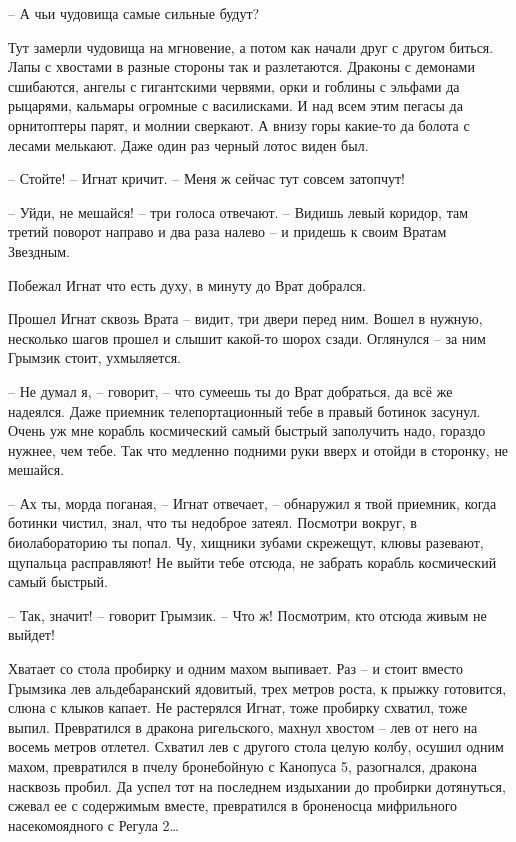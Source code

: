 \documentclass[ebook,oneside,final,openright]{memoir}
\begin{document}
– А чьи чудовища самые сильные будут?\par
Тут замерли чудовища на мгновение, а потом как начали друг с другом биться. Лапы с хвостами в разные стороны так и разлетаются. Драконы с демонами сшибаются, ангелы с гигантскими червями, орки и гоблины с эльфами да рыцарями, кальмары огромные с василисками. И над всем этим пегасы да орнитоптеры парят, и молнии сверкают. А внизу горы какие-то да болота с лесами мелькают. Даже один раз черный лотос виден был. \par
– Стойте! – Игнат кричит. – Меня ж сейчас тут совсем затопчут!\par
– Уйди, не мешайся! – три голоса отвечают. – Видишь левый коридор, там третий поворот направо и два раза налево – и придешь к своим Вратам Звездным.\par
\par
Побежал Игнат что есть духу, в минуту до Врат добрался.\par
\par
Прошел Игнат сквозь Врата – видит, три двери перед ним. Вошел в нужную, несколько шагов прошел и слышит какой-то шорох сзади. Оглянулся – за ним Грымзик стоит, ухмыляется. \par
\par
– Не думал я, – говорит, – что сумеешь ты до Врат добраться, да всё же надеялся. Даже приемник телепортационный тебе в правый ботинок засунул. Очень уж мне корабль космический самый быстрый заполучить надо, гораздо нужнее, чем тебе. Так что медленно подними руки вверх и отойди в сторонку, не мешайся.\par
– Ах ты, морда поганая, – Игнат отвечает, – обнаружил я твой приемник, когда ботинки чистил, знал, что ты недоброе затеял. Посмотри вокруг, в биолабораторию ты попал. Чу, хищники зубами скрежещут, клювы разевают, щупальца расправляют! Не выйти тебе отсюда, не забрать корабль космический самый быстрый.\par
– Так, значит! – говорит Грымзик. – Что ж! Посмотрим, кто отсюда живым не выйдет!\par
\par
Хватает со стола пробирку и одним махом выпивает. Раз – и стоит вместо Грымзика лев альдебаранский ядовитый, трех метров роста, к прыжку готовится, слюна с клыков капает. Не растерялся Игнат, тоже пробирку схватил, тоже выпил. Превратился в дракона ригельского, махнул хвостом – лев от него на восемь метров отлетел. Схватил лев с другого стола целую колбу, осушил одним махом, превратился в пчелу бронебойную с Канопуса 5, разогнался, дракона насквозь пробил. Да успел тот на последнем издыхании до пробирки дотянуться, сжевал ее с содержимым вместе, превратился в броненосца мифрильного насекомоядного с Регула 2…\par
\end{document}
